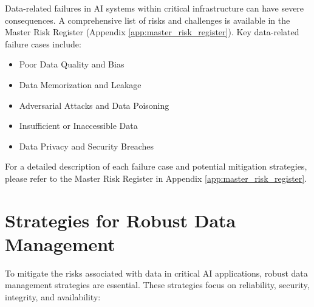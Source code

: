Data-related failures in AI systems within critical infrastructure can have severe consequences. A comprehensive list of risks and challenges is available in the Master Risk Register (Appendix \ref{app:master_risk_register}). Key data-related failure cases include:

\begin{itemize}
    \item Poor Data Quality and Bias
    \item Data Memorization and Leakage
    \item Adversarial Attacks and Data Poisoning
    \item Insufficient or Inaccessible Data
    \item Data Privacy and Security Breaches
\end{itemize}

For a detailed description of each failure case and potential mitigation strategies, please refer to the Master Risk Register in Appendix \ref{app:master_risk_register}.

\section{Strategies for Robust Data Management}
\label{sec:data_management_strategies}
To mitigate the risks associated with data in critical AI applications, robust data management strategies are essential. These strategies focus on reliability, security, integrity, and availability:

